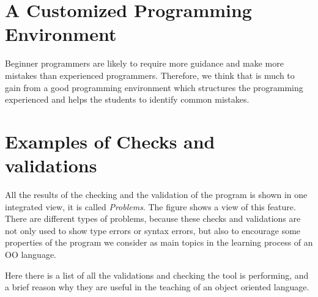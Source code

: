 
\section{A Customized Programming Environment}
\label{sec:environment}

Beginner programmers are likely to require more guidance and make more mistakes than experienced programmers.
Therefore, we think that is much to gain from a good programming environment which structures the programming experienced and helps the students to identify common mistakes.

% 

\section{Examples of Checks and validations}

All the results of the checking and the validation of the program is shown in one integrated view, it is called \emph{Problems}. The figure  shows a view of this feature. 
There are different types of problems, because these checks and validations are not only used to show type errors or syntax errors, but also to encourage some properties of the program we consider as main topics in the learning process of an OO language.

Here there is a list of all the validations and checking the tool is performing, and a brief reason why they are useful in the teaching of an object oriented language.

